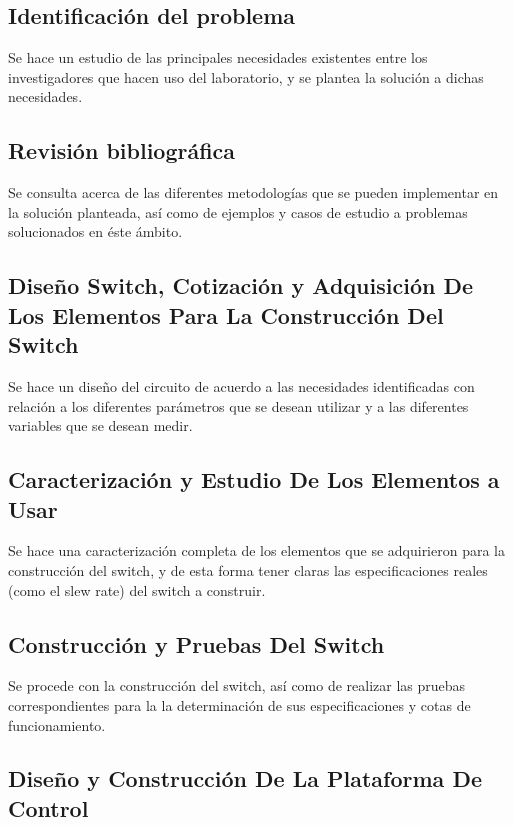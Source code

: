 \subsection{Identificación del problema}

Se hace un estudio de las principales necesidades existentes entre los investigadores que hacen uso del laboratorio, y se plantea la solución a dichas necesidades.  
\subsection{Revisión bibliográfica}

Se consulta acerca de las diferentes metodologías que se pueden implementar en la solución planteada, así como de ejemplos y casos de estudio a problemas solucionados en éste ámbito. 

\subsection{Diseño Switch, Cotización y Adquisición De Los Elementos Para La Construcción Del Switch}

Se hace un diseño del circuito de acuerdo a las necesidades identificadas con relación a los diferentes parámetros que se desean utilizar y a las diferentes variables que se desean medir. 

\subsection{Caracterización y Estudio De Los Elementos a Usar}

Se hace una caracterización completa de los elementos que se adquirieron para la construcción del switch, y de esta forma tener claras las especificaciones reales (como el slew rate) del switch a construir. 

\subsection{Construcción y Pruebas Del Switch}

Se procede con la construcción del switch, así como de realizar las pruebas correspondientes para la la determinación de sus especificaciones y cotas de funcionamiento.

\subsection{Diseño y Construcción De La Plataforma De Control}

